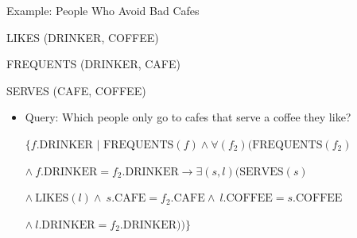 \documentclass[aspectratio=169]{beamer}
\newenvironment{noindentitemize}
{ \begin{itemize}
 \setlength{\itemsep}{1.5ex}
  \setlength{\parsep}{0pt}   
  \setlength{\parskip}{0pt}
 \addtolength{\leftskip}{-2em}
 }
{ \end{itemize} }
\begin{document}
\begin{frame}{Example: People Who Avoid Bad Cafes}

LIKES (DRINKER, COFFEE)

FREQUENTS (DRINKER, CAFE)

SERVES (CAFE, COFFEE)

\begin{noindentitemize}
\item Query: Which people only go to cafes that serve a coffee they like?

\vspace{10 pt}
$\{f.\textrm{DRINKER } | \textrm{ FREQUENTS}(f) \wedge \forall(f_2)(\textrm{FREQUENTS}(f_2)$

\hspace{2em}$\wedge\ f.\textrm{DRINKER} = f_2.\textrm{DRINKER} \rightarrow \exists(s, l)(\textrm{SERVES}(s)$

\hspace{2em}$ \wedge\ \textrm{LIKES}(l) \wedge\ s.\textrm{CAFE} = f_2.\textrm{CAFE} \wedge\ l.\textrm{COFFEE} = s.\textrm{COFFEE}$

\hspace{2em}$\wedge\	l.\textrm{DRINKER} = f_2.\textrm{DRINKER}))\}$

\end{noindentitemize}
\end{frame}
\end{document}
